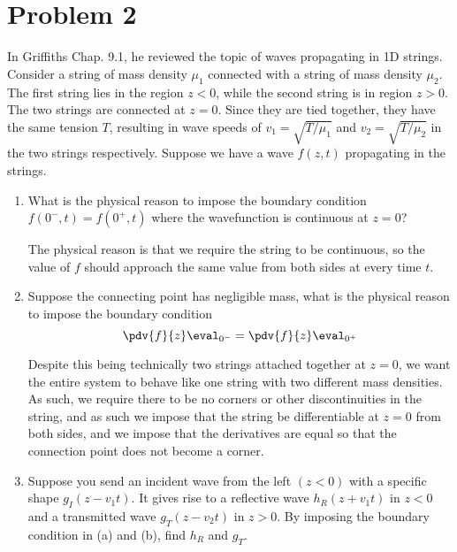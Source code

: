 \documentclass[10pt]{article}
\begin{document}
	\section*{Problem 2}
	In Griffiths Chap. 9.1, he reviewed the topic of waves propagating in 1D strings. Consider a string of
	mass density \( \mu_1 \) connected with a string of mass density \( \mu_2 \). The first string lies in the
	region \( z < 0 \), while the second string is in region \( z > 0 \). The two strings are connected at \(
	z = 0\). Since they are tied together, they have the same tension \( T \), resulting in wave speeds of \(
	v_1 = \sqrt{T / \mu_1}\) and \( v_2 = \sqrt{T / \mu_2} \) in the two strings respectively. Suppose we
	have a wave \( f(z, t) \) propagating in the strings.
	\begin{enumerate}[label=(\alph*)]
		\item What is the physical reason to impose the boundary condition \( f(0^{-}, t) = f(0^{+}, t) \)
			where the wavefunction is continuous at \( z = 0 \)?

			\begin{solution}
				The physical reason is that we require the string to be continuous, so the value of \( f \)
				should approach the same value from both sides at every time \( t \).  
			\end{solution}
		\item Suppose the connecting point has negligible mass, what is the physical reason to impose the
			boundary condition
			\[
				\pdv{f}{z}\eval_{0^{-}} = \pdv{f}{z}\eval_{0^{+}}
			\]
			\begin{solution}
				Despite this being technically two strings attached together at \( z = 0 \), we want the
				entire system to behave like one string with two different mass densities. As such, we
				require there to be no corners or other discontinuities in the string, and as such we impose
				that the string be differentiable at \( z = 0 \) from both sides, and we impose that the
				derivatives are equal so that the connection point does not become a corner.    
			\end{solution}
		\item Suppose you send an incident wave from the left \( (z < 0) \) with a specific shape \( g_I(z -
			v_1t) \). It gives rise to a reflective wave \( h_R(z + v_1t) \) in \( z < 0 \) and a transmitted
			wave \( g_T(z - v_2t) \) in \( z > 0 \). By imposing the boundary condition in (a) and (b), find
			\( h_R \) and \( g_T \). 


\end{enumerate}
\end{document}
